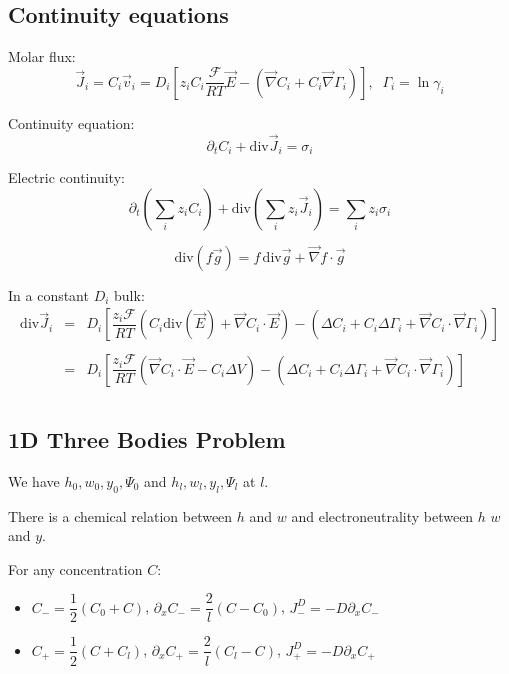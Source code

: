 \documentclass[aps,12pt]{revtex4}
\begin{document}
\subsection{Continuity equations}

Molar flux:
\begin{equation}
	\vec{J}_i = C_i \vec{v}_i = D_i \left[z_i C_i  \dfrac{\mathcal{F}}{RT} \vec{E} - \left(\vec{\nabla} C_i + C_i \vec{\nabla}\Gamma_i\right) \right],\;\;\Gamma_i = \ln \gamma_i
\end{equation}

Continuity equation:
\begin{equation}
	\partial_t C_i + \mathrm{div} \vec{J}_i = \sigma_i
\end{equation}

Electric continuity:
\begin{equation}
	\partial_t \left(\sum_i z_i C_i\right) + \mathrm{div} \left(\sum_i z_i \vec{J}_i\right) = \sum_i z_i \sigma_i
\end{equation}


\begin{equation}
	\mathrm{div}(f\vec{g}) = f \, \mathrm{div}\vec{g} + \vec{\nabla} f \cdot \vec{g}
\end{equation}

In a constant $D_i$ bulk:
\begin{equation}
\begin{array}{rcl}
\mathrm{div} \vec{J}_i & = & D_i \left[ \dfrac{z_i\mathcal{F}}{RT} 
\left(C_i \mathrm{div}\left(\vec{E}\right) + \vec{\nabla} C_i \cdot \vec{E} \right) 
- \left( \Delta C_i + C_i \Delta \Gamma_i + \vec{\nabla} C_i \cdot \vec{\nabla} \Gamma_i \right)
\right]\\
\\
 & = &  D_i \left[ \dfrac{z_i\mathcal{F}}{RT} 
\left(  \vec{\nabla} C_i \cdot \vec{E} - C_i \Delta V \right) 
- \left( \Delta C_i + C_i \Delta \Gamma_i + \vec{\nabla} C_i \cdot \vec{\nabla} \Gamma_i \right)
\right]\\
\end{array}
\end{equation}

\subsection{1D Three Bodies Problem}

We have $h_0,w_0,y_0,\Psi_0$ and $h_l,w_l,y_l,\Psi_l$ at $l$.

There is a chemical relation between $h$ and $w$ and
electroneutrality between $h$ $w$ and $y$.

For any concentration $C$:
\begin{itemize}
	\item $C_- = \dfrac{1}{2}(C_0+C)$, $\partial_x C_- = \dfrac{2}{l}(C-C_0)$, $J^D_- = - D \partial_x C_-$
	\item $C_+ = \dfrac{1}{2}(C+C_l)$, $\partial_x C_+ = \dfrac{2}{l}(C_l-C)$, $J^D_+ = - D \partial_x C_+$
\end{itemize}
\end{document}
